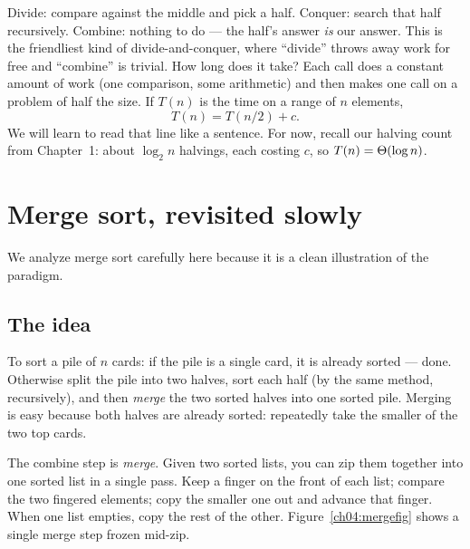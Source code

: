 Divide: compare against the middle and pick a half. Conquer: search that half
recursively. Combine: nothing to do --- the half's answer \emph{is} our answer.
This is the friendliest kind of divide-and-conquer, where ``divide'' throws away
work for free and ``combine'' is trivial. How long does it take? Each call does a
constant amount of work (one comparison, some arithmetic) and then makes one call
on a problem of half the size. If $T(n)$ is the time on a range of $n$ elements,
\[T(n) = T(n/2) + c.\]
We will learn to read that line like a sentence. For now, recall our halving
count from Chapter~1: about $\log_2 n$ halvings, each costing $c$, so $T(n) = \Theta(\log n)$.

\section{Merge sort, revisited slowly}

We analyze merge sort carefully here because it is a clean illustration of the paradigm.

\subsection{The idea}

\begin{intuitionbox}
To sort a pile of $n$ cards: if the pile is a single card, it is already sorted ---
done. Otherwise split the pile into two halves, sort each half (by the same
method, recursively), and then \emph{merge} the two sorted halves into one sorted
pile. Merging is easy because both halves are already sorted: repeatedly take the
smaller of the two top cards.
\end{intuitionbox}

The combine step is \emph{merge}. Given two sorted lists, you can
zip them together into one sorted list in a single pass. Keep a finger on the
front of each list; compare the two fingered elements; copy the smaller one out
and advance that finger. When one list empties, copy the rest of the other.
Figure~\ref{ch04:mergefig} shows a single merge step frozen mid-zip.


